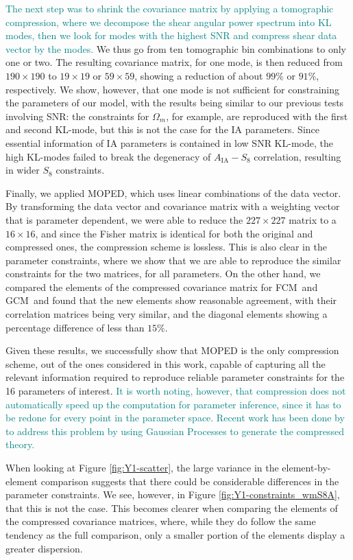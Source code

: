 \documentclass[twocolumn]{\docclass}
\newcommand{\rf}[1]{Figure \ref{fig:#1}}
\newcommand\full{FCM}
\newcommand\gaussian{GCM}
\begin{document}
	\textcolor{teal}{The next step was to shrink the covariance matrix by applying a tomographic compression, where we decompose the shear angular power spectrum into KL modes, then we look for modes with the highest SNR and compress shear data vector by the modes.} We thus go from ten tomographic bin combinations to only one or two. The resulting covariance matrix, for one mode, is then reduced from $190 \times 190$ to $19 \times 19$ or $59 \times 59$, showing a reduction of about $99\%$ or $91\%$, respectively. We show, however, that one mode is not sufficient for constraining the parameters of our model, with the results being similar to our previous tests involving SNR: the constraints for $\Omega_m$, for example, are reproduced with the first and second KL-mode, but this is not the case for the IA parameters. Since essential information of IA parameters is contained in low SNR KL-mode, the high KL-modes failed to break the degeneracy of $A_{\mathrm{IA}}-S_8$ correlation, resulting in wider $S_8$ constraints. 
	
	Finally, we applied MOPED, which uses linear combinations of the data vector. By transforming the data vector and covariance matrix with a weighting vector that is parameter dependent, we were able to reduce the $227 \times 227$ matrix to a $16 \times 16$, and since the Fisher matrix is identical for both the original and compressed ones, the compression scheme is lossless. This is also clear in the parameter constraints, where we show that we are able to reproduce the similar constraints for the two matrices, for all parameters. On the other hand, we compared the elements of the compressed covariance matrix for \full\ and \gaussian\ and found that the new elements show reasonable agreement, with their correlation matrices being very similar, and the diagonal elements showing a percentage difference of less than $15\%$.
	
	Given these results, we successfully show that MOPED is the only compression scheme, out of the ones considered in this work, capable of capturing all the relevant information required to reproduce reliable parameter constraints for the 16 parameters of interest. \textcolor{teal}{It is worth noting, however, that compression does not automatically speed up the computation for parameter inference, since it has to be redone for every point in the parameter space. Recent work has been done by \cite{Mootoovaloo:2020} to address this problem by using Gaussian Processes to generate the compressed theory.}
	
	When looking at \rf{Y1-scatter}, the large variance in the element-by-element comparison suggests that there could be considerable differences in the parameter constraints. We see, however, in \rf{Y1-constraints_wmS8A}, that this is not the case. This becomes clearer when comparing the elements of the compressed covariance matrices, where, while they do follow the same tendency as the full comparison, only a smaller portion of the elements display a greater dispersion.
	
\end{document}
